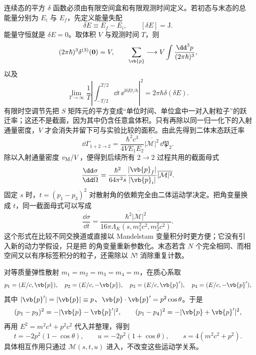 连续态的平方 \(\delta\) 函数必须由有限空间盒和有限观测时间定义。若初态与末态的总能量分别为 $E_i$ 与 $E_f$，先定义能量失配
\begin{equation*}
 \delta E\equiv E_f-E_i,\qquad [\delta E]=\mathrm J.
\end{equation*}
能量守恒就是 $\delta E=0$。取体积 \(V\) 与观测时间 \(T\)，则
\begin{equation}
 (2\pi\hbar)^3\delta^{(3)}(\mathbf0)=V,
 \qquad
 \sum_{\vb{p}}\longrightarrow
 V\int\frac{\dd^3 p}{(2\pi\hbar)^3},
 \label{eq:box-delta-density-r15}
\end{equation}
以及
\begin{equation}
 \lim_{T\to\infty}\frac1T
 \left|\int_{-T/2}^{T/2}\dd t\,\ee^{\ii\delta E t/\hbar}\right|^2
 =2\pi\hbar\delta(\delta E).
 \label{eq:delta-square-time-r15}
\end{equation}
有限时空调节先把 $S$ 矩阵元的平方变成“单位时间、单位盒中一对入射粒子”的跃迁率；这还不是截面，因为其中仍含任意盒体积。只有再除以同一归一化下的入射通量密度，$V$ 才会消失并留下可与实验比较的面积。由此先得到二体末态跃迁率
\begin{equation}
 {
 \dd\Gamma_{1+2\to2}
 =\frac{\hbar^2c^3}{4VE_1E_2}
 \overline{|\mathcal M|^2}\,\dd\mathfrak P_2.}
 \label{eq:box-transition-rate-r15}
\end{equation}
除以入射通量密度 \(v_{\rm M}/V\)，便得到后续所有 \(2\to2\) 过程共用的截面母式
\begin{equation}
 {
 \frac{\dd\sigma}{\dd\Omega}
 =\frac{\hbar^2}{64\pi^2s}
 \frac{|\vb{p}_f|}{|\vb{p}_i|}
 \overline{|\mathcal M|^2}.}
 \label{eq:2to2-cross-section-master-si-r9}
\end{equation}
固定 \(s\) 时，\(t=(p_1-p_3)^2\) 对散射角的依赖完全由二体运动学决定。把角变量换成 \(t\)，同一截面母式可以写成
\begin{equation}
 {
 \frac{\dd\sigma}{\dd t}
 =\frac{\hbar^2\overline{|\mathcal M|^2}}
 {16\pi\Lambda_K(s,m_1^2c^2,m_2^2c^2)}.}
 \label{eq:2to2-dsigma-dt-si-r68}
\end{equation}
这个形式在比较不同交换道或直接以 Mandelstam 变量积分时更方便；它没有引入新的动力学假设，只是把 的角变量重新参数化。末态若含 \(N\) 个完全相同、而相空间又以有序标签积分的粒子，还需除以 \(N!\) 消除重复计数。

对等质量弹性散射 \(m_1=m_2=m_3=m_4=m\)，在质心系取
\begin{equation*}
p_1=(E/c,\vb{p}),\quad p_2=(E/c,-\vb{p}),\quad
p_3=(E/c,\vb{p}'),\quad p_4=(E/c,-\vb{p}'),
\end{equation*}
其中 $|\vb{p}'|=|\vb{p}|\equiv p$、$\vb{p}\cdot\vb{p}'=p^2\cos\theta$。于是
\begin{equation*}
(p_1-p_3)^2=-|\vb{p}-\vb{p}'|^2,
\qquad
(p_1-p_4)^2=-|\vb{p}+\vb{p}'|^2,
\end{equation*}
再用 $E^2=m^2c^4+p^2c^2$ 代入并整理，得到
\begin{equation}
 {
 t=-2p^2(1-\cos\theta),
 \qquad
 u=-2p^2(1+\cos\theta),
 \qquad
 s=4(m^2c^2+p^2).}
 \label{eq:t-u-cm-equalmass-si-r9}
\end{equation}
具体相互作用只通过 \(\mathcal M(s,t,u)\) 进入，不改变这些运动学关系。

